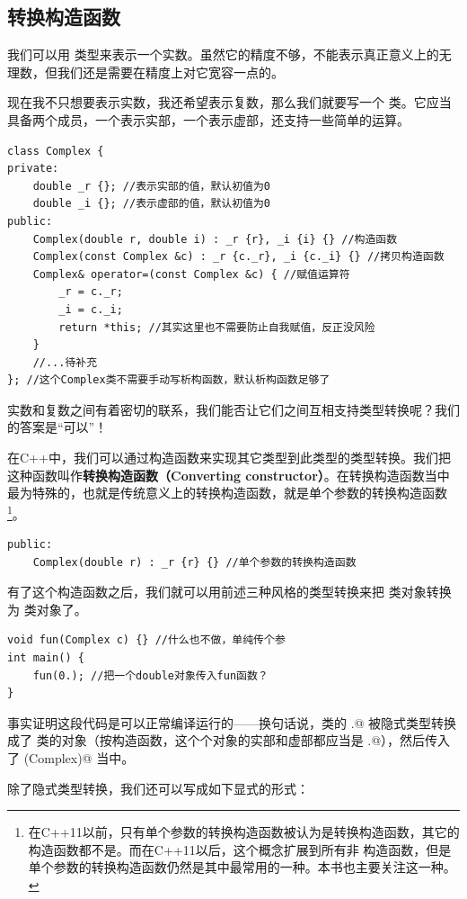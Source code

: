 \subsection*{转换构造函数}
我们可以用 \lstinline@double@ 类型来表示一个实数。虽然它的精度不够，不能表示真正意义上的无理数，但我们还是需要在精度上对它宽容一点的。\par
现在我不只想要表示实数，我还希望表示复数，那么我们就要写一个 \lstinline@Complex@ 类。它应当具备两个成员，一个表示实部，一个表示虚部，还支持一些简单的运算。
\begin{lstlisting}
class Complex {
private:
    double _r {}; //表示实部的值，默认初值为0
    double _i {}; //表示虚部的值，默认初值为0
public:
    Complex(double r, double i) : _r {r}, _i {i} {} //构造函数
    Complex(const Complex &c) : _r {c._r}, _i {c._i} {} //拷贝构造函数
    Complex& operator=(const Complex &c) { //赋值运算符
        _r = c._r;
        _i = c._i;
        return *this; //其实这里也不需要防止自我赋值，反正没风险
    }
    //...待补充
}; //这个Complex类不需要手动写析构函数，默认析构函数足够了
\end{lstlisting}
实数和复数之间有着密切的联系，我们能否让它们之间互相支持类型转换呢？我们的答案是``可以''！\par
在C++中，我们可以通过构造函数来实现其它类型到此类型的类型转换。我们把这种函数叫作\textbf{转换构造函数（Converting constructor）}。在转换构造函数当中最为特殊的，也就是传统意义上的转换构造函数，就是单个参数的转换构造函数\footnote{在C++11以前，只有单个参数的转换构造函数被认为是转换构造函数，其它的构造函数都不是。而在C++11以后，这个概念扩展到所有非 \lstinline@explicit@ 构造函数，但是单个参数的转换构造函数仍然是其中最常用的一种。本书也主要关注这一种。}。
\begin{lstlisting}
public:
    Complex(double r) : _r {r} {} //单个参数的转换构造函数
\end{lstlisting}
有了这个构造函数之后，我们就可以用前述三种风格的类型转换来把 \lstinline@double@ 类对象转换为 \lstinline@Complex@ 类对象了。\par
\begin{lstlisting}
void fun(Complex c) {} //什么也不做，单纯传个参
int main() {
    fun(0.); //把一个double对象传入fun函数？
}
\end{lstlisting}
事实证明这段代码是可以正常编译运行的——换句话说，\lstinline@double@ 类的 .@ 被隐式类型转换成了 \lstinline@Complex@ 类的对象（按构造函数，这个个对象的实部和虚部都应当是 .@），然后传入了 \lstinline@fun(Complex)@ 当中。\par
除了隐式类型转换，我们还可以写成如下显式的形式：

